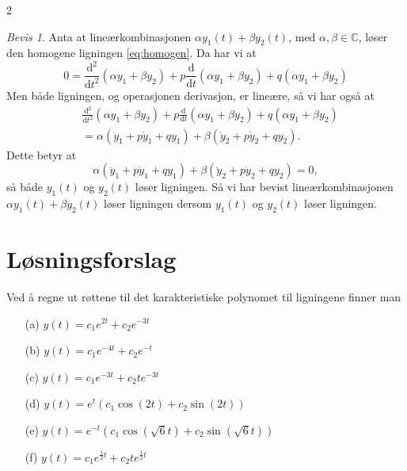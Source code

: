 \documentclass{article}
\theoremstyle{definition}
\newenvironment{customoppg}[1]
{\renewcommand\theinnercustomoppg{#1}\innercustomoppg}
{\endinnercustomoppg}
\theoremstyle{remark}
\newtheorem*{bevis}{Bevis}
\begin{document}
\begin{multicols*}{2}
\begin{bevis}
  Anta at lineærkombinasjonen $\alpha y_1(t) + \beta y_2(t)$, med $\alpha, \beta \in \mathbb{C}$, løser den homogene ligningen \eqref{eq:homogen}. Da har vi at 
  \begin{equation*}
    0 = \frac{\mathrm{d}^2}{\mathrm{d} t^2}(\alpha y_1 + \beta y_2) + p \frac{\mathrm{d}}{\mathrm{d} t} (\alpha y_1 + \beta y_2) + q (\alpha y_1 + \beta y_2)
  \end{equation*}
  Men både ligningen, og operasjonen derivasjon, er lineære, så vi har også at
  \begin{equation*}
    \begin{split}
      & \frac{\mathrm{d}^2}{\mathrm{d} t^2}(\alpha y_1 + \beta y_2) + p \frac{\mathrm{d}}{\mathrm{d} t} (\alpha y_1 + \beta y_2) + q (\alpha y_1 + \beta y_2) \\
      & = \alpha (\ddot{y}_1 + p \dot{y}_1 + q y_1) + \beta (\ddot{y}_2 + p \dot{y}_2 + q y_2).
    \end{split}
  \end{equation*}
  Dette betyr at
  \begin{equation*}
    \alpha (\ddot{y}_1 + p \dot{y}_1 + q y_1) + \beta (\ddot{y}_2 + p \dot{y}_2 + q y_2) = 0,
  \end{equation*}
  så både $y_1(t)$ og $y_2(t)$ løser ligningen. Så vi har bevist lineærkombinasjonen $\alpha y_1(t) + \beta y_2(t)$ løser ligningen dersom $y_1(t)$ og $y_2(t)$ løser ligningen.
\end{bevis}


\newpage
\section*{Løsningsforslag}

\begin{customoppg}{1}
  Ved å regne ut røttene til det karakteristiske polynomet til ligningene finner man
  \begin{itemize}
    \item[(a)] $y(t) = c_1 e^{2t} + c_2 e^{-3t}$
    \item[(b)] $y(t) = c_1 e^{-4t} + c_2 e^{-t}$
    \item[(c)] $y(t) = c_1 e^{-3t} + c_2 te^{-3t}$
    \item[(d)] $y(t) = e^t (c_1 \cos(2t) + c_2 \sin(2t))$
    \item[(e)] $y(t) = e^{-t} (c_1 \cos(\sqrt{6}t) + c_2 \sin(\sqrt{6}t))$
    \item[(f)] $y(t) = c_1 e^{\frac{1}{2}t} + c_2 t e^{\frac{1}{2}t}$
  \end{itemize}
\end{customoppg}


\end{multicols*}
\end{document}
